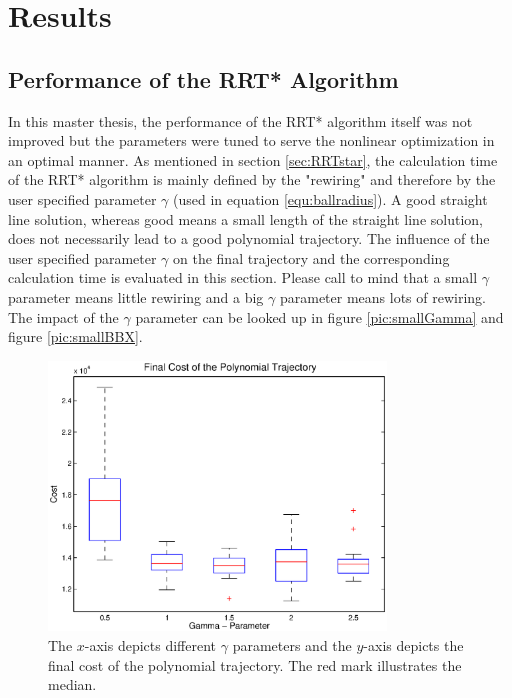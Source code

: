 \chapter{Results}\label{chap:Results}


\section{Performance of the RRT* Algorithm}\label{sec:performanceRRT}

In this master thesis, the performance of the RRT* algorithm itself was not improved but the parameters were tuned to serve the nonlinear optimization in an optimal manner.\newline
As mentioned in section \ref{sec:RRTstar}, the calculation time of the RRT* algorithm is mainly defined by the "rewiring" and therefore by the user specified parameter $\gamma$ (used in equation \ref{equ:ballradius}). A good straight line solution, whereas good means a small length of the straight line solution, does not necessarily lead to a good polynomial trajectory. The influence of the user specified parameter $\gamma$ on the final trajectory and the corresponding calculation time is evaluated in this section. \newline
Please call to mind that a small $\gamma$ parameter means little rewiring and a big $\gamma$ parameter means lots of rewiring. The impact of the $\gamma$ parameter can be looked up in figure \ref{pic:smallGamma} and figure \ref{pic:smallBBX}.\newline

\begin{figure}[H]
   \centering
   \includegraphics[trim = 14mm 10mm 15mm 0mm,clip,width=0.8\textwidth]{pics/boxplot1.eps}
   \caption{The $x$-axis depicts different $\gamma$ parameters and the $y$-axis depicts the final cost of the polynomial trajectory. The red mark illustrates the median. }
   \label{pic:boxplot}
\end{figure}


